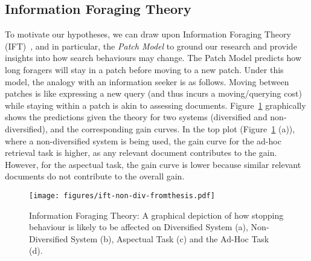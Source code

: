 \subsection{Information Foraging Theory} \label{sec:ift}


To motivate our hypotheses, we can draw upon Information Foraging Theory (IFT)~\cite{pirolli1999ift}, and in particular, the \textit{Patch Model} to ground our research and provide insights into how search behaviours may change. %
The Patch Model predicts how long foragers will stay in a patch before moving to a new patch. Under this model, the analogy with an information seeker is as follows. Moving between patches is like expressing a new query (and thus incurs a moving/querying cost) while staying within a patch is akin to assessing documents. 
Figure~\ref{fig_ift_patches} graphically shows the predictions given the theory for two systems (diversified and non-diversified), and the corresponding gain curves. In the top plot (Figure~\ref{fig_ift_patches} (a)), where a non-diversified system is being used, the gain curve for the ad-hoc retrieval task is higher, as any relevant document contributes to the gain. However, for the aspectual task, the gain curve is lower because similar relevant documents do not contribute to the overall gain.

\begin{figure}[t!]
\begin{center}
        \texttt{[image: figures/ift-non-div-fromthesis.pdf]}
        \vspace{-2mm}
    \caption{Information Foraging Theory: A graphical depiction of how stopping behaviour is likely to be affected on Diversified System (a), Non-Diversified System (b), Aspectual Task (c) and the Ad-Hoc Task (d).} \label{fig_ift_patches}    
    \vspace{-6mm}
\end{center}
\end{figure}



